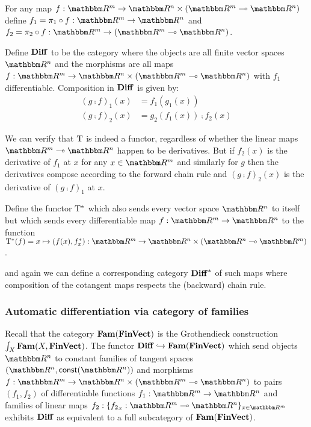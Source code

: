 For any map $f: \RR^m \to \RR^n \times (\RR^m \linearto \RR^n)$ define $f_1 = \pi_1 \comp f: \RR^m \to \RR^n$
and $f_2 = \pi_2 \comp f: \RR^m \to (\RR^m \linearto \RR^n)$.

\begin{definition}[$\Diff$]
\label{def:auto-diff:Diff}
Define $\Diff$ to be the category where the objects are all finite vector spaces $\RR^n$ and the morphisms
are all maps $f: \RR^m \to \RR^n \times (\RR^m \linearto \RR^n)$ with $f_1$ differentiable. Composition in
$\Diff$ is given by:
\begin{align*}
(g \comp f)_1(x) &= f_1(g_1(x)) \\
(g \comp f)_2(x) &= g_2(f_1(x)) \comp f_2(x)
\end{align*}
\end{definition}

We can verify that $\mathrm{T}$ is indeed a functor, regardless of whether the linear maps $\RR^m \linearto
\RR^n$ happen to be derivatives. But if $f_2(x)$ is the derivative of $f_1$ at $x$ for any $x \in \RR^m$ and
similarly for $g$ then the derivatives compose according to the forward chain rule and $(g \comp f)_2(x)$ is
the derivative of $(g \comp f)_1$ at $x$.

\begin{definition}
Define the functor $\mathrm{T}^*$ which also sends every vector space $\RR^n$ to itself but which sends every
differentiable map $f: \RR^m \to \RR^n$ to the function $\cotangents(f) = x \mapsto (f(x), \pullf{f}_x): \RR^m
\to \RR^n \times (\RR^n \linearto \RR^m)$.
\end{definition}

\noindent and again we can define a corresponding category $\mathbf{Diff}^*$ of such maps where composition of the
cotangent maps respects the (backward) chain rule.

\subsubsection{Automatic differentiation via category of families}

Recall that the category $\mathbf{Fam}(\mathbf{FinVect})$ is the Grothendieck construction $\int_{X}\mathbf{Fam}(X,
\mathbf{FinVect})$. The functor $\mathbf{Diff} \hookrightarrow \mathbf{Fam}(\mathbf{FinVect})$ which send objects $\RR^n$ to constant families
of tangent spaces $(\RR^n, \const(\RR^n))$ and morphisms $f: \RR^m \to \RR^n \times (\RR^m \linearto
\RR^n)$ to pairs $(f_1, f_2)$ of differentiable functions $f_1: \RR^m \to \RR^n$ and families of linear maps
$f_2: \{{f_2}_x: \RR^m \linearto \RR^n\}_{x \in \RR^m}$ exhibits $\Diff$ as equivalent to a full subcategory
of $\mathbf{Fam}(\mathbf{FinVect})$.


